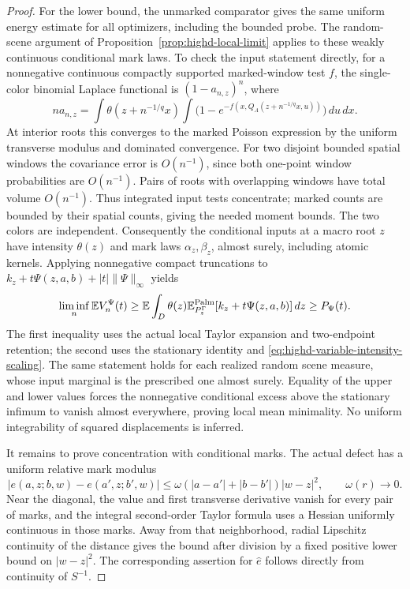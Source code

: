 \documentclass[11pt,reqno]{amsart}
\theoremstyle{definition}
\theoremstyle{remark}
\numberwithin{equation}{section}
\newcommand{\E}{\mathbb E}
\begin{document}
\begin{proof}
For the lower bound, the unmarked comparator gives the same uniform
energy estimate for all optimizers, including the bounded probe.
The random-scene argument of Proposition~\ref{prop:highd-local-limit}
applies to these weakly continuous conditional mark laws. To check
the input statement directly, for a nonnegative continuous compactly
supported marked-window test \(f\), the single-color binomial Laplace
functional is \((1-a_{n,z})^n\), where
\[
 n a_{n,z}=\int \theta(z+n^{-1/q}x)
   \int\bigl(1-e^{-f(x,Q_A(z+n^{-1/q}x,u))}\bigr)\,du\,dx.
\]
At interior roots this converges to the marked Poisson expression
by the uniform transverse modulus and dominated convergence.
For two disjoint bounded spatial windows the covariance error is
\(O(n^{-1})\), since both one-point window probabilities are \(O(n^{-1})\).
Pairs of roots with overlapping windows have total volume \(O(n^{-1})\).
Thus integrated input tests concentrate; marked counts are bounded
by their spatial counts, giving the needed moment bounds. The two
colors are independent. Consequently the conditional inputs at a
macro root \(z\) have intensity \(\theta(z)\) and mark laws
\(\alpha_z,\beta_z\), almost surely, including atomic kernels.
Applying nonnegative compact
truncations to \(k_z+t\Psi(z,a,b)+|t|\|\Psi\|_\infty\) yields
\begin{equation}
\label{eq:highd-variable-lower}
 \liminf_n\E V_n^\Psi(t)
 \ge\E\int_D\theta(z)\E_{P_z^\Gamma}^{\rm Palm}
                 [k_z+t\Psi(z,a,b)]\,dz
 \ge P_\Psi(t).
\end{equation}
The first inequality uses the actual local Taylor expansion and
two-endpoint retention; the second uses the stationary identity and
\eqref{eq:highd-variable-intensity-scaling}. The same statement holds
for each realized random scene measure, whose input marginal is the
prescribed one almost surely. Equality of the upper and lower values
forces the nonnegative conditional excess above the stationary infimum
to vanish almost everywhere, proving local mean minimality. No uniform
integrability of squared displacements is inferred.

It remains to prove concentration with conditional marks. The actual
defect has a uniform relative mark modulus
\begin{equation}
\label{eq:highd-relative-mark-modulus}
 |e(a,z;b,w)-e(a',z;b',w)|
 \le\omega(|a-a'|+|b-b'|)|w-z|^2,
 \qquad \omega(r)\longrightarrow0.
\end{equation}
Near the diagonal, the value and first transverse derivative vanish
for every pair of marks, and the integral second-order Taylor formula
uses a Hessian uniformly continuous in those marks. Away from that
neighborhood, radial Lipschitz continuity of the distance gives the
bound after division by a fixed positive lower bound on \(|w-z|^2\).
The corresponding assertion for \(\widehat e\) follows directly from
continuity of \(S^{-1}\).


\end{proof}
\end{document}
